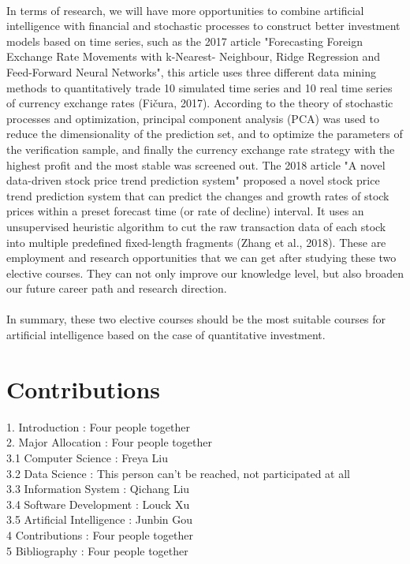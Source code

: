 \documentclass{article}
\begin{document}
    \\
    In terms of research, we will have more opportunities to combine artificial intelligence with financial and stochastic processes to construct better investment models based on time series, such as the 2017 article "Forecasting Foreign Exchange Rate Movements with k-Nearest- Neighbour, Ridge Regression and Feed-Forward Neural Networks", this article uses three different data mining methods to quantitatively trade 10 simulated time series and 10 real time series of currency exchange rates (Fičura, 2017). According to the theory of stochastic processes and optimization, principal component analysis (PCA) was used to reduce the dimensionality of the prediction set, and to optimize the parameters of the verification sample, and finally the currency exchange rate strategy with the highest profit and the most stable was screened out. The 2018 article "A novel data-driven stock price trend prediction system" proposed a novel stock price trend prediction system that can predict the changes and growth rates of stock prices within a preset forecast time (or rate of decline) interval. It uses an unsupervised heuristic algorithm to cut the raw transaction data of each stock into multiple predefined fixed-length fragments (Zhang et al., 2018). These are employment and research opportunities that we can get after studying these two elective courses. They can not only improve our knowledge level, but also broaden our future career path and research direction.\\
    \\
    In summary, these two elective courses should be the most suitable courses for artificial intelligence based on the case of quantitative investment.



	
	
	\section{Contributions}
	    1. Introduction : Four people together\\
	    2. Major Allocation : Four people together\\
	    3.1 Computer Science : Freya Liu\\
	    3.2 Data Science : This person can't be reached, not participated at all\\
	    3.3 Information System : Qichang Liu\\
	    3.4 Software Development : Louck Xu\\
	    3.5 Artificial Intelligence : Junbin Gou\\
	    4 Contributions : Four people together\\
	    5 Bibliography : Four people together
	    
\end{document}
